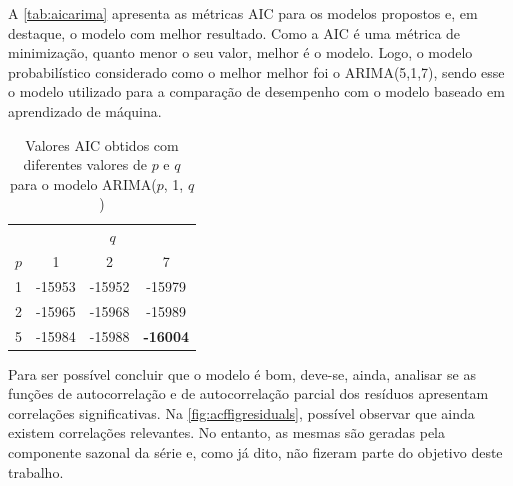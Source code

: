 \documentclass[
    12pt,
    oneside,
    a4paper,
    english,
    brazil
]{abntex2}
\begin{document}
A \autoref{tab:aicarima} apresenta as métricas AIC para os modelos propostos e,
em  destaque, o  modelo com  melhor  resultado. Como  a  AIC é  uma métrica  de
minimização,  quanto menor  o seu  valor,  melhor é  o modelo.  Logo, o  modelo
probabilístico considerado como o melhor  melhor foi o ARIMA(5,1,7), sendo esse
o modelo  utilizado para  a comparação  de desempenho com  o modelo  baseado em
aprendizado de máquina.

\begin{table}[ht]
\centering
    \caption{Valores AIC obtidos com diferentes valores de $p$ e $q$ para o modelo ARIMA($p$, 1, $q$)}\label{tab:aicarima}
\begin{tabular}{l c c c}
                        & \multicolumn{3}{c}{$q$}           \\
    $p$                 & 1      & 2      & 7               \\
    \toprule
    1                   & -15953 & -15952 & -15979          \\
    2                   & -15965 & -15968 & -15989          \\
    5                   & -15984 & -15988 & \cellcolor[HTML]{AAAAAA}\textbf{-16004} \\
\end{tabular}
\end{table}

Para ser possível concluir  que o modelo é bom, deve-se,  ainda, analisar se as
funções de autocorrelação  e de autocorrelação parcial  dos resíduos apresentam
correlações significativas. Na \autoref{fig:acffigresiduals}, possível observar
que ainda  existem correlações  relevantes. No entanto,  as mesmas  são geradas
pela componente sazonal da série e, como já dito, não fizeram parte do objetivo
deste trabalho.
\end{document}
